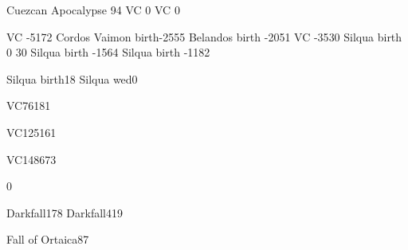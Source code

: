 \newcommand{\ic}{\value{VC}}
                               {Cuezcan Apocalypse} {94}
                               {VC}                 {0}
 {VC}                 {0}

    {VC}                 {-51}{72}
         {Cordos Vaimon birth}{-25}{55}
           {Belandos birth}     {-20}{51}
           {VC}                 {-35}{30}
    {Silqua birth}       {0}  {30}
     {Silqua birth}       {-15}{64}
    {Silqua birth}       {-11}{82}

              {Silqua birth}{18}
          {Silqua wed}{0}




\begin{comment}
\subsection{Darkfall time}
\end{comment}

  {VC}{761}{81}

          {VC}{1251}{61}

           {VC}{1486}{73}

  {0}



\begin{comment}
\subsection{Ortaican and Tepharin}
\end{comment}

         {Darkfall}{178}
        {Darkfall}{419}

           {Fall of Ortaica}{87}

